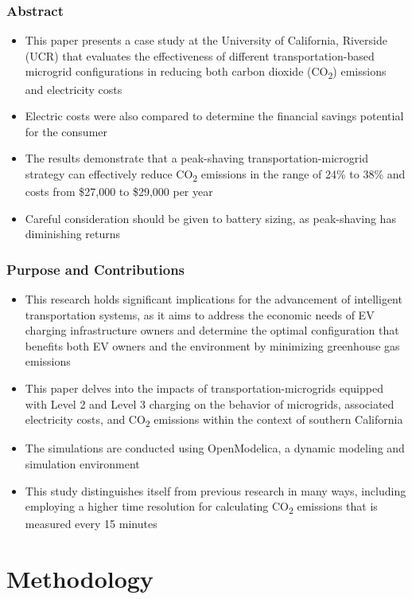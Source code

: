 \documentclass[aspectratio=169, 8 pt]{beamer}
\begin{document}
	\begin{frame}
		\frametitle{Abstract}	
		\begin{itemize} \LARGE
			\item This paper presents a case study at the University of California, Riverside (UCR) that evaluates the effectiveness of different transportation-based microgrid configurations in reducing both carbon dioxide (CO\textsubscript{2}) emissions and electricity costs
			\item Electric costs were also compared to determine the financial savings potential for the consumer
			\item The results demonstrate that a peak-shaving transportation-microgrid strategy can effectively reduce CO\textsubscript{2} emissions in the range of 24\% to 38\% and costs from \$27,000 to \$29,000 per year
			\item  Careful consideration should be given to battery sizing, as peak-shaving has diminishing returns
		\end{itemize}
	\end{frame}
	
	\begin{frame}
		\frametitle{Purpose and Contributions}
			\begin{itemize} \LARGE
				\item This research holds significant implications for the advancement of intelligent transportation systems, as it aims to address the economic needs of EV charging infrastructure owners and determine the optimal configuration that benefits both EV owners and the environment by minimizing greenhouse gas emissions
				\item This paper delves into the impacts of transportation-microgrids equipped with Level 2 and Level 3 charging on the behavior of microgrids, associated electricity costs, and CO\textsubscript{2} emissions within the context of southern California
				\item The simulations are conducted using OpenModelica, a dynamic modeling and simulation environment
				\item This study distinguishes itself from previous research in many ways, including employing a higher time resolution for calculating CO\textsubscript{2} emissions that is measured every 15 minutes
			\end{itemize}
	\end{frame}

\section{Methodology}
	
\end{document}

